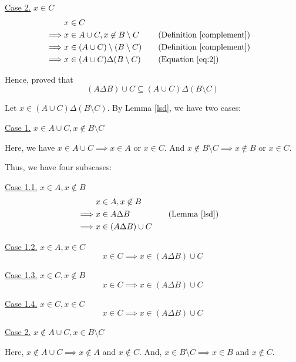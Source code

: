 \begin{enumerate}
\begin{named}[Part 1]
		      \underline{Case 2.} $x \in C$
		      \begin{align*}
			               & x \in C \\
			      \implies & x \in A \cup C, x \not\in B \setminus C
							&& \quad \text{(Definition \ref{complement})} \\
			      \implies & x \in (A \cup C) \setminus (B \setminus C)
							&& \quad \text{(Definition \ref{complement})} \\
			      \implies & x \in (A \cup C) \Delta (B \setminus C)
							&& \quad \text{(Equation \ref{eq:2})}
		      \end{align*}

					Hence, proved that $$(A \Delta B) \cup C \subseteq (A \cup C) \Delta (B \setminus C)$$
	      \end{named}

	      \begin{named}[Part 2]
					Let $x \in (A \cup C) \Delta (B \setminus C)$. By Lemma \ref{lsd}, we have two cases:

					\underline{Case 1.} $x \in A \cup C, x \not\in B \setminus C$

					Here, we have $x \in A \cup C \implies x \in A$ or $x \in C$.
					And $x \not\in B \setminus C \implies x \not\in B$ or $x \in C$.

					Thus, we have four subscases:

					\underline{Case 1.1.} $x \in A, x \not\in B$
					\begin{align*}
						&x \in A, x \not\in B \\
						\implies &x \in A \Delta B
										 && \quad \text{(Lemma \ref{lsd})} \\
						\implies &x \in (A \Delta B) \cup C
					\end{align*}

					\underline{Case 1.2.} $x \in A, x \in C$
					$$x \in C \implies x \in (A \Delta B) \cup C$$

					\underline{Case 1.3.} $x \in C, x \not\in B$
					$$x \in C \implies x \in (A \Delta B) \cup C$$

					\underline{Case 1.4.} $x \in C, x \in C$
					$$x \in C \implies x \in (A \Delta B) \cup C$$

					\underline{Case 2.} $x \not\in A \cup C, x \in B \setminus C$

					Here, $x \not\in A \cup C \implies x \not\in A$ and $x \not\in C$.
					And, $x \in B \setminus C \implies x \in B$ and $x \not\in C$.


\end{named}
\end{enumerate}
